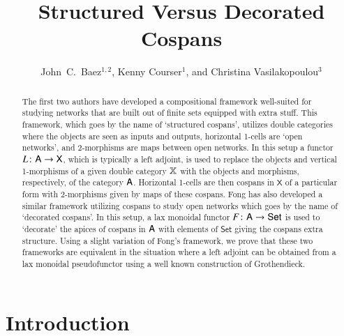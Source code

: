 \documentclass[reqno]{amsart}
\title{Structured Versus Decorated Cospans}
\author{John\ C.\ Baez$^{1,2}$, Kenny Courser$^1$, and Christina Vasilakopoulou$^3$}
\begin{document}
\begin{abstract}
\noindent
The first two authors have developed a compositional framework well-suited for studying networks that are built out of finite sets equipped 
with extra stuff. This framework, which goes by the name of `structured cospans', utilizes double categories where the objects are seen as 
inputs and outputs, horizontal 1-cells are `open networks', and 2-morphisms are maps between open networks. In this setup a functor $L \colon 
\mathsf{A} \to \textsf{X}$, which is typically a left adjoint, is used to replace the objects and vertical 1-morphisms of a given double category 
$\mathbf{\mathbb X}$ with the objects and morphisms, respectively, of the category $\mathsf{A}$. Horizontal 1-cells are then cospans in $\textsf{X}$ of a 
particular form with 2-morphisms given by maps of these cospans. Fong has also developed a similar framework utilizing cospans to study open 
networks which goes by the name of `decorated cospans'. In this setup, a lax monoidal functor $F \colon \mathsf{A} \to \textsf{Set}$ is used to 
`decorate' the apices of cospans in $\mathsf{A}$ with elements of $\textsf{Set}$ giving the cospans extra structure. Using a slight variation of 
Fong's framework, we prove that these two frameworks are equivalent in the situation where a left adjoint can be obtained from a lax 
monoidal pseudofunctor using a well known construction of Grothendieck.
\end{abstract}

\maketitle

\setcounter{tocdepth}{1}
\tableofcontents

\section{Introduction}
\end{document}
